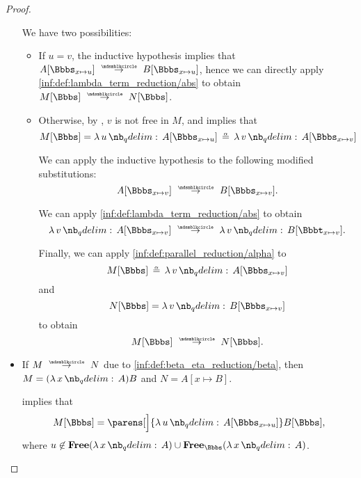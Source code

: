 \begin{proof}
\begin{itemize}
    We have two possibilities:
    \begin{itemize}
      \item If \( u = v \), the inductive hypothesis implies that \( A[\Bbbs_{x \mapsto u}] \pred B[\Bbbs_{x \mapsto u}] \), hence we can directly apply \ref{inf:def:lambda_term_reduction/abs} to obtain \( M[\Bbbs] \pred N[\Bbbs] \).

      \item Otherwise, by , \( v \) is not free in \( M \), and  implies that
      \begin{equation*}
        M[\Bbbs]
        =
        \qabs u A[\Bbbs_{x \mapsto u}]
        \aequiv
        \qabs v A[\Bbbs_{x \mapsto v}]
      \end{equation*}

      We can apply the inductive hypothesis to the following modified substitutions:
      \begin{equation*}
        A[\Bbbs_{x \mapsto v}] \pred B[\Bbbs_{x \mapsto v}].
      \end{equation*}

      We can apply \ref{inf:def:lambda_term_reduction/abs} to obtain
      \begin{equation*}
        \qabs v A[\Bbbs_{x \mapsto v}] \pred \qabs v B[\Bbbt_{x \mapsto v}].
      \end{equation*}

      Finally, we can apply \ref{inf:def:parallel_reduction/alpha} to
      \begin{equation*}
        M[\Bbbs] \aequiv \qabs v A[\Bbbs_{x \mapsto v}]
      \end{equation*}
      and
      \begin{equation*}
        N[\Bbbs] = \qabs v B[\Bbbs_{x \mapsto v}]
      \end{equation*}
      to obtain
      \begin{equation*}
        M[\Bbbs] \pred N[\Bbbs].
      \end{equation*}
    \end{itemize}

    \item If \( M \pred N \) due to \ref{inf:def:beta_eta_reduction/beta}, then \( M = (\qabs x A)B \) and \( N = A[x \mapsto B] \).

     implies that
    \begin{equation*}
      M[\Bbbs] = \parens[\Big]{ \qabs u A[\Bbbs_{x \mapsto u}] } B[\Bbbs],
    \end{equation*}
    where \( u \not\in \op*{Free}(\qabs x A) \cup \op*{Free}_\Bbbs(\qabs x A) \).


\end{itemize}
\end{proof}
